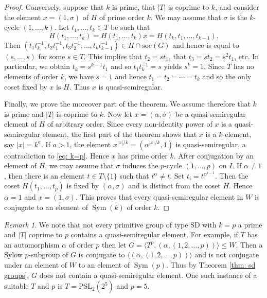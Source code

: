 \documentclass{article}
\theoremstyle{remark}
\newtheorem{rem}[thm]{Remark}
\theoremstyle{definition}
\DeclareMathOperator{\Sym}{Sym}
\newcommand{\soc}{\mathrm{soc}}
\newcommand{\PSL}{\mathrm{PSL}}
\newcommand{\qsr}{quasi-semiregular}
\newcommand{\qsre}{quasi-semiregular element}
\begin{document}
\begin{proof}
Conversely, suppose that $k$ is prime,  that $|T|$ is coprime to $k$,  and consider the element $x=(1,\sigma)$ of $H$ of prime order $k$. We may assume that $\sigma$ is the $k$-cycle $(1,\ldots,k)$. Let $t_1,\ldots,t_k \in T$ be such that
$$H(t_1,\ldots,t_k) = H(t_1,\ldots,t_k)x = H(t_k,t_1,\ldots,t_{k-1}).$$
Then  $(t_1 t_k^{-1},t_2t_1^{-1},t_3t_2^{-1},\ldots,t_kt_{k-1}^{-1})\in H\cap \soc(G)$ and hence is equal to $(s,\ldots,s)$ for some $s\in T$. This implies that $t_2 =st_1$, that $t_3 = st_2 = s^2 t_1$, etc. In particular, we obtain $t_k = s^{k-1}t_1$ and so  $t_1 t_k^{-1}=s$ yields $s^k =1$. Since   $T$ has no elements of order $k$, we have $s=1$ and hence $t_1=t_2 =\cdots = t_k$ and so the only coset fixed by $x$ is $H$. Thus $x$ is {\qsr}.
 

Finally, we prove the moreover part of the theorem. We assume therefore that $k$ is prime and $|T|$ is coprime to $k$. Now let $x=(\alpha,\sigma)$ be a {\qsre} of $H$ of arbitrary order. Since every non-identity power of $x$ is a {\qsre}, the first part of the theorem shows   that $x$ is a $k$-element, say $|x|=k^a$. If $a>1$, the element  $x^{|x|/k} =(\alpha^{|x|/k},1)$ is {\qsr}, a contradiction to \eqref{eq: k=p}. Hence $x$ has prime order $k$. 
After conjugation by an element of  $H$, we may assume that $\sigma$ induces the $p$-cycle $(1,\ldots,p)$ on $I$. If $\alpha\neq 1$, then there is an element $t\in T\setminus\{1\}$ such that $t^\alpha \neq t$. Set $t_i = t^{\alpha^{i-1}}$. Then the coset $H(t_1,\ldots,t_p)$ is fixed by $(\alpha,\sigma)$ and is distinct from the coset $H$. Hence  $\alpha=1$ and $x=(1,\sigma)$. 
This proves that every  {\qsre} in $W$ is conjugate   to an element of  $\Sym(k)$ of order  $k$.
\end{proof}

\begin{rem}\label{rem:noSDeg}
 We note that not every primitive group of type SD with $k=p$ a prime and $|T|$ coprime to $p$ contains a \qsre. For example, if $T$ has an automorphism $\alpha$ of order $p$ then let $G=\langle T^p, (\alpha,(1,2,\ldots, p))\rangle\leqslant W$. Then a Sylow $p$-subgroup of $G$ is conjugate to $\langle (\alpha,(1,2,\ldots, p))\rangle$ and is not conjugate under an element of $W$ to an element of $\Sym(p)$. Thus by Theorem \ref{thm: sd groups}, $G$ does not contain a \qsre. One such instance of a suitable $T$ and $p$ is $T=\PSL_2(2^5)$ and $p=5$. 
\end{rem}
\end{document}
